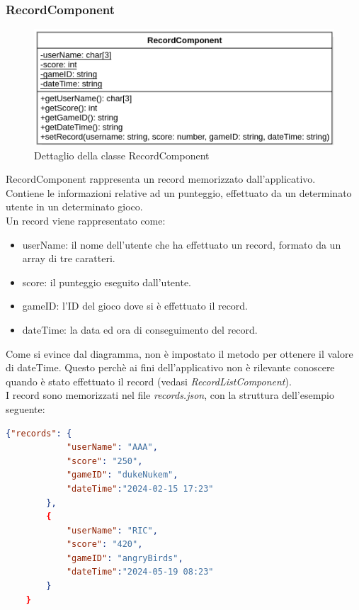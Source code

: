 \subsubsection{RecordComponent}
\begin{figure}[h]
    \centering
    \includegraphics[width=340pt]{ProgettazioneTecnica/Record.png}
    \caption{Dettaglio della classe RecordComponent}
    \label{fig:recordComponent}
\end{figure}
RecordComponent rappresenta un record memorizzato dall'applicativo.\\ Contiene le informazioni relative ad un punteggio, effettuato da un determinato utente in un determinato gioco.\\
Un record viene rappresentato come:
\begin{itemize}
    \item userName: il nome dell'utente che ha effettuato un record, formato da un array di tre caratteri.
    \item score: il punteggio eseguito dall'utente.
    \item gameID: l'ID del gioco dove si è effettuato il record.
    \item dateTime: la data ed ora di conseguimento del record.
\end{itemize}
Come si evince dal diagramma, non è impostato il metodo per ottenere il valore di dateTime. Questo perchè ai fini dell'applicativo non è rilevante conoscere quando è stato effettuato il record (vedasi \emph{RecordListComponent}).\\
I record sono memorizzati nel file \emph{records.json}, con la struttura dell'esempio seguente:
\begin{lstlisting}[language=json,firstnumber=1]
    {"records": {
            "userName": "AAA",
            "score": "250",
            "gameID": "dukeNukem",
            "dateTime":"2024-02-15 17:23"
        },
        {
            "userName": "RIC",
            "score": "420",
            "gameID": "angryBirds",
            "dateTime":"2024-05-19 08:23"
        }
    }
\end{lstlisting}
